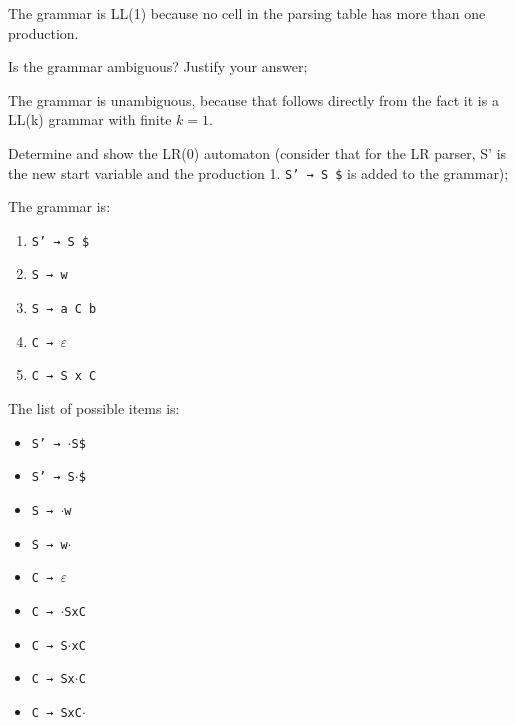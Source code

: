 \documentclass[docid=2019]{comp_exam_round2}
\begin{document}
The grammar is LL(1) because no cell in the parsing table has more than one production.

\question
Is the grammar ambiguous? Justify your answer;

\ansseparator

\noindent
The grammar is unambiguous, because that follows directly from the fact it is a LL(k) grammar with finite $k=1$.

\question
Determine and show the LR(0) automaton (consider that for the LR parser, S' is the new start variable and the production 1. \texttt{S' → S \$} is added to the grammar);

\ansseparator

\begin{minipage}[t]{0.49\textwidth}
The grammar is:
\begin{enumerate}
    \item \texttt{S' → S \$}
    \item \texttt{S → w}
    \item \texttt{S → a C b}
    \item \texttt{C → $\varepsilon$}
    \item \texttt{C → S x C}
\end{enumerate}
\end{minipage}
\begin{minipage}[t]{0.49\textwidth}
The list of possible items is:
\begin{itemize}[wide, noitemsep]
    \item \texttt{S' → $\cdot$S\$}
    \item \texttt{S' → S$\cdot$\$}
    \item \texttt{S → $\cdot$w}
    \item \texttt{S → w$\cdot$}
    \item \texttt{C → $\varepsilon$}
    \item \texttt{C → $\cdot$SxC}
    \item \texttt{C → S$\cdot$xC}
    \item \texttt{C → Sx$\cdot$C}
    \item \texttt{C → SxC$\cdot$}
\end{itemize}
\end{minipage}
\end{document}
